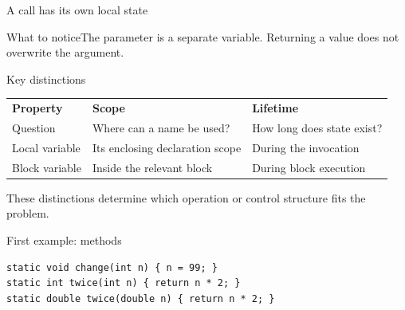 \documentclass[10pt,aspectratio=169]{beamer}
\begin{document}
\begin{frame}[fragile,t]{A call has its own local state}
\begin{center}\end{center}
\begin{block}{What to notice}The parameter is a separate variable. Returning a value does not overwrite the argument.\end{block}
\end{frame}
\begin{frame}[fragile,t]{Key distinctions}
\small\renewcommand{\arraystretch}{1.5}
\begin{tabularx}{\textwidth}{>{\raggedright\arraybackslash}X>{\raggedright\arraybackslash}X>{\raggedright\arraybackslash}X}
\rowcolor{navy}
\color{white}\bfseries Property & \color{white}\bfseries Scope & \color{white}\bfseries Lifetime\\
Question & Where can a name be used? & How long does state exist?\\
Local variable & Its enclosing declaration scope & During the invocation\\
Block variable & Inside the relevant block & During block execution\\
\end{tabularx}
\vspace{3mm}\footnotesize These distinctions determine which operation or control structure fits the problem.
\end{frame}

\begin{frame}[fragile,t]{First example: methods}
\begin{lstlisting}
static void change(int n) { n = 99; }
static int twice(int n) { return n * 2; }
static double twice(double n) { return n * 2; }
\end{lstlisting}
\end{frame}
\end{document}
